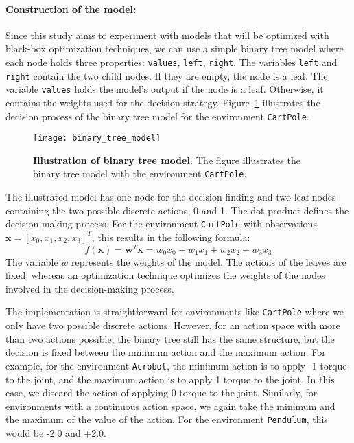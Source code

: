 \paragraph*{Construction of the model:} Since this study aims to experiment with models that will be optimized with black-box optimization techniques, we can use a simple binary tree model where each node holds three properties: \verb|values|, \verb|left|, \verb|right|. The variables \verb|left| and \verb|right| contain the two child nodes. If they are empty, the node is a leaf. The variable \verb|values| holds the model's output if the node is a leaf. Otherwise, it contains the weights used for the decision strategy. Figure~\ref{fig:binary_tree_model_illustration} illustrates the decision process of the binary tree model for the environment \verb|CartPole|.
\begin{figure}[!ht]
\centering
\texttt{[image: binary\_tree\_model]}
\caption[Illustration of binary tree model]{
  \textbf{Illustration of binary tree model.}
  The figure illustrates the binary tree model with the environment \texttt{CartPole}.
}
\label{fig:binary_tree_model_illustration}
\end{figure}
The illustrated model has one node for the decision finding and two leaf nodes containing the two possible discrete actions, 0 and 1. The dot product defines the decision-making process. For the environment \verb|CartPole| with observations $\mathbf{x} = [x_0, x_1, x_2, x_3]^T$, this results in the following formula:
\[
  f(\mathbf{x}) = \mathbf{w}^T\mathbf{x} = w_0 x_0 + w_1 x_1 + w_2 x_2 + w_3 x_3
\]
The variable $w$ represents the weights of the model. The actions of the leaves are fixed, whereas an optimization technique optimizes the weights of the nodes involved in the decision-making process.

The implementation is straightforward for environments like \verb|CartPole| where we only have two possible discrete actions. However, for an action space with more than two actions possible, the binary tree still has the same structure, but the decision is fixed between the minimum action and the maximum action. For example, for the environment \verb|Acrobot|, the minimum action is to apply -1 torque to the joint, and the maximum action is to apply 1 torque to the joint. In this case, we discard the action of applying 0 torque to the joint. Similarly, for environments with a continuous action space, we again take the minimum and the maximum of the value of the action. For the environment \verb|Pendulum|, this would be -2.0 and +2.0.

